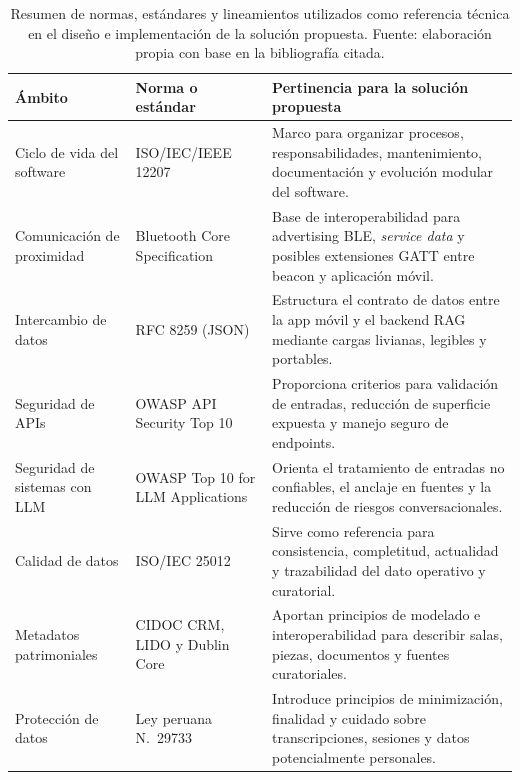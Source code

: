 \begin{table}[!ht]
    \centering
    \scriptsize
    \setlength{\tabcolsep}{4pt}
    \begin{tabular}{>{\raggedright\arraybackslash}p{3.2cm} >{\raggedright\arraybackslash}p{4.0cm} >{\raggedright\arraybackslash}p{7.4cm}}
        \hline
        \textbf{Ámbito} & \textbf{Norma o estándar} & \textbf{Pertinencia para la solución propuesta} \\
        \hline
        Ciclo de vida del software & ISO/IEC/IEEE 12207 & Marco para organizar procesos, responsabilidades, mantenimiento, documentación y evolución modular del software. \\
        Comunicación de proximidad & Bluetooth Core Specification & Base de interoperabilidad para advertising BLE, \textit{service data} y posibles extensiones GATT entre beacon y aplicación móvil. \\
        Intercambio de datos & RFC 8259 (JSON) & Estructura el contrato de datos entre la app móvil y el backend RAG mediante cargas livianas, legibles y portables. \\
        Seguridad de APIs & OWASP API Security Top 10 & Proporciona criterios para validación de entradas, reducción de superficie expuesta y manejo seguro de endpoints. \\
        Seguridad de sistemas con LLM & OWASP Top 10 for LLM Applications & Orienta el tratamiento de entradas no confiables, el anclaje en fuentes y la reducción de riesgos conversacionales. \\
        Calidad de datos & ISO/IEC 25012 & Sirve como referencia para consistencia, completitud, actualidad y trazabilidad del dato operativo y curatorial. \\
        Metadatos patrimoniales & CIDOC CRM, LIDO y Dublin Core & Aportan principios de modelado e interoperabilidad para describir salas, piezas, documentos y fuentes curatoriales. \\
        Protección de datos & Ley peruana N.\ 29733 & Introduce principios de minimización, finalidad y cuidado sobre transcripciones, sesiones y datos potencialmente personales. \\
        \hline
    \end{tabular}
    \caption[Normas y estándares relevantes para la solución propuesta]{Resumen de normas, estándares y lineamientos utilizados como referencia técnica en el diseño e implementación de la solución propuesta. Fuente: elaboración propia con base en la bibliografía citada.}
    \label{tab:normas-estandares-museiq}
\end{table}

